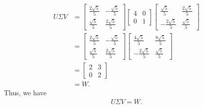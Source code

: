 \documentclass{article}
\begin{document}
\begin{align*}
    U\Sigma V &= \begin{bmatrix}
\frac{2 \sqrt{5}}{5} & -\frac{\sqrt{5}}{5} \\
\frac{\sqrt{5}}{5} & \frac{2 \sqrt{5}}{5}
\end{bmatrix}\begin{bmatrix}
4 & 0 \\
0 & 1
\end{bmatrix}  \begin{bmatrix}
\frac{\sqrt5 }{5} & \frac{2\sqrt{5}}{5} \\
-\frac{2\sqrt{5}}{5} & \frac{\sqrt 5 }{5}
\end{bmatrix} \\
              &= \begin{bmatrix}
\frac{2 \sqrt{5}}{5} & -\frac{\sqrt{5}}{5} \\
\frac{\sqrt{5}}{5} & \frac{2 \sqrt{5}}{5}
\end{bmatrix} \begin{bmatrix}
              \frac{4 \sqrt{5}}{5} & \frac{8 \sqrt{5}}{5} \\
              -\frac{2 \sqrt{5}}{5} & \frac{\sqrt{5}}{5}
              \end{bmatrix}\\
&= \begin{bmatrix}
2 & 3 \\
0 & 2
\end{bmatrix}\\
&= W.
\end{align*}
Thus, we have
\begin{align*}
    U\Sigma V = W.
\end{align*}
\end{document}
